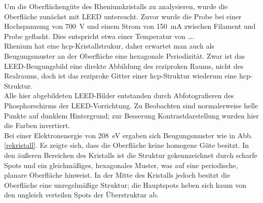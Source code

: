 \FloatBarrier

Um die Oberflächengüte des Rheniumkristalls zu analysieren, wurde die Oberfläche zunächst mit LEED
untersucht. Zuvor wurde die Probe bei einer Hochspannung von \SI{700}{V} und einem Strom
von \SI{150}{mA} zwischen Filament und Probe geflasht. Dies entspricht etwa einer Temperatur von
\ldots.\\
Rhenium hat eine hcp-Kristallstrukur, daher erwartet man auch als Beugungsmuster an der Oberfläche
eine hexagonale Periodizität. Zwar ist das LEED-Beugungsbild eine direkte Abbildung des reziproken
Raums, nicht des Realraums, doch ist das reziproke Gitter einer hcp-Struktur wiederum eine
hcp-Struktur.\\
Alle hier abgebildeten LEED-Bilder entstanden durch Abfotografieren des Phosphorschirms der
LEED-Vorrichtung. Zu Beobachten sind normalerweise helle Punkte auf dunklem Hintergrund; zur
Besserung Kontrastdarstellung wurden hier die Farben invertiert.\\
Bei einer Elektronenergie von \SI{208}{eV} ergaben sich Beugungsmuster wie in Abb. \ref{rekristall}.
Es zeigte sich, dass die Oberfläche keine homogene Güte besitzt. In den äußeren Bereichen des
Kristalls ist die Struktur gekennzeichnet durch scharfe Spots und ein gleichmäßiges, hexagonales
Muster, was auf eine periodische, planare Oberfläche hinweist. In der Mitte des Kristalls jedoch
besitzt die Oberfläche eine unregelmäßige Struktur; die Hauptspots heben sich kaum von den ungleich
verteilen Spots der Überstruktur ab.

